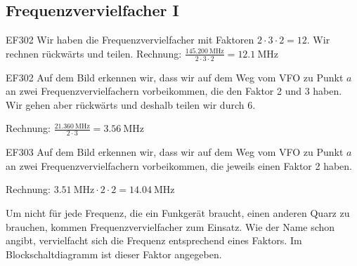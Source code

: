 \subsection{Frequenzvervielfacher I}


\begin{sol}{EF302}
    Wir haben die Frequenzvervielfacher mit Faktoren $2\cdot 3 \cdot 2 = 12$. Wir rechnen rückwärts und teilen.
    Rechnung: $\frac{\SI{145.200}{\mega\hertz}}{2\cdot 3\cdot 2} = \SI{12.1}{\mega\hertz}$
\end{sol}

\begin{sol}{EF302}
    Auf dem Bild erkennen wir, dass wir auf dem Weg vom VFO zu Punkt $a$ an zwei Frequenzvervielfachern vorbeikommen, die den Faktor 2 und 3 haben. Wir gehen aber rückwärts und deshalb teilen wir durch 6.
    
    Rechnung: $\frac{\SI{21.360}{\mega\hertz}}{2\cdot 3} = \SI{3.56}{\mega\hertz}$
\end{sol}
\begin{sol}{EF303}
    Auf dem Bild erkennen wir, dass wir auf dem Weg vom VFO zu Punkt $a$ an zwei Frequenzvervielfachern vorbeikommen, die jeweils einen Faktor 2 haben.
    
    Rechnung: $\SI{3.51}{\mega\hertz} \cdot 2 \cdot 2 = \SI{14.04}{\mega\hertz}$
\end{sol}
\begin{ohmchapter}
    Um nicht für jede Frequenz, die ein Funkgerät braucht, einen anderen Quarz zu brauchen, kommen Frequenzvervielfacher zum Einsatz. Wie der Name schon angibt, vervielfacht sich die Frequenz entsprechend eines Faktors. Im Blockschaltdiagramm ist dieser Faktor angegeben.
\end{ohmchapter}